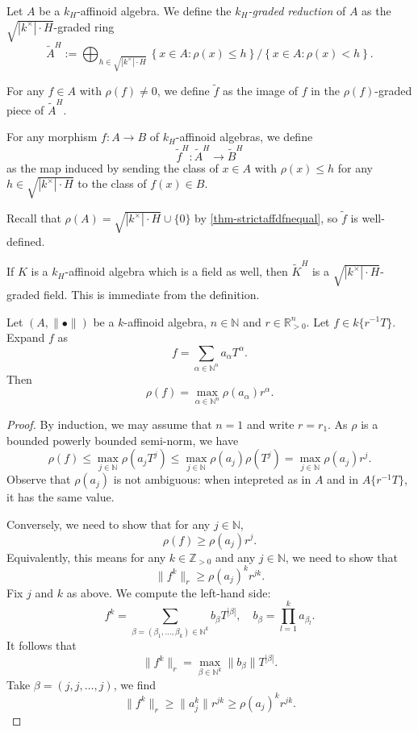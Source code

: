 \begin{definition}
    Let $A$ be a $k_H$-affinoid algebra. We define the \emph{$k_H$-graded reduction} of $A$ as the $\sqrt{|k^{\times}|\cdot H}$-graded ring
    \[
      \tilde{A}^H:=\bigoplus_{h\in \sqrt{|k^{\times}|\cdot H}}\left\{x\in A:\rho(x)\leq  h\right\}/\left\{x\in A:\rho(x)<  h\right\}.  
    \]

    For any $f\in A$ with $\rho(f)\neq 0$, we define $\tilde{f}$ as the image of $f$ in the $\rho(f)$-graded piece of $\tilde{A}^H$.

    For any morphism $f:A\rightarrow B$ of $k_H$-affinoid algebras, we define 
    \[
        \tilde{f}^H:  \tilde{A}^H\rightarrow \tilde{B}^H
    \]
    as the map induced by sending the class of $x\in A$ with $\rho(x)\leq h$ for any $h\in \sqrt{|k^{\times}|\cdot H}$ to the class of $f(x)\in B$.


\end{definition}
Recall that $\rho(A)=\sqrt{|k^{\times}|\cdot H}\cup\{0\}$ by \cref{thm-strictaffdfnequal}, so $\tilde{f}$ is well-defined.

\begin{example}
    If $K$ is a $k_H$-affinoid algebra which is a field as well, then $\tilde{K}^H$ is a $\sqrt{|k^{\times}|\cdot H}$-graded field. This is immediate from the definition.
\end{example}



\begin{lemma}\label{lma-rhointatering}
    Let $(A,\|\bullet\|)$ be a $k$-affinoid algebra, $n\in \mathbb{N}$ and $r\in \mathbb{R}^n_{>0}$. Let $f\in k\{r^{-1}T\}$. Expand $f$ as
    \[
        f=\sum_{\alpha\in \mathbb{N}^n}a_{\alpha}T^{\alpha}.  
    \]
    Then 
    \[
        \rho(f)=\max_{\alpha\in \mathbb{N}^n} \rho(a_{\alpha})r^{\alpha}.
    \]
\end{lemma}
\begin{proof}
    By induction, we may assume that $n=1$ and write $r=r_1$. As $\rho$ is a bounded powerly bounded semi-norm, we have
    \[
        \rho(f)\leq \max_{j\in \mathbb{N}}\rho(a_{j}T^j) \leq \max_{j\in \mathbb{N}}\rho(a_{j})\rho(T^j)= \max_{j\in \mathbb{N}} \rho(a_j)r^j.  
    \]
    Observe that $\rho(a_j)$ is not ambiguous: when intepreted as in $A$ and in $A\{r^{-1}T\}$, it has the same value.

    Conversely, we need to show that for any $j\in \mathbb{N}$, 
    \[
        \rho(f)\geq \rho(a_j)r^j.  
    \]
    Equivalently, this means for any $k\in \mathbb{Z}_{>0}$ and any $j\in \mathbb{N}$, we need to show that
    \[
        \|f^k\|_r\geq \rho(a_j)^k r^{jk}.  
    \]
    Fix $j$ and $k$ as above.
    We compute the left-hand side:
    \[
        f^k=\sum_{\beta=(\beta_1,\ldots,\beta_k)\in \mathbb{N}^k} b_{\beta} T^{|\beta|},\quad b_{\beta}=\prod_{l=1}^k a_{\beta_l}.  
    \]
    It follows that
    \[
        \|f^k\|_r=\max_{\beta \in \mathbb{N}^k} \|b_{\beta}\|T^{|\beta|}.
    \]
    Take $\beta=(j,j,\ldots,j)$, we find
    \[
        \|f^k\|_r\geq \|a_j^k\| r^{jk}\geq \rho(a_j)^k r^{jk}.
    \]
\end{proof}

